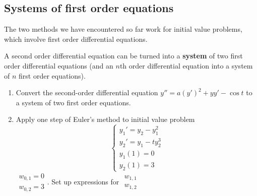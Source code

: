 \documentclass[12pt,letterpaper,noanswers]{exam}
\begin{document}
\subsection*{Systems of first order equations}
\begin{tcolorbox}
The two methods we have encountered so far work for initial value problems, which involve first order differential equations.

A second order differential equation can be turned into a \textbf{system} of two first order differential equations (and an $n$th order differential equation into  a system of $n$ first order equations).
\end{tcolorbox}
\begin{enumerate}[resume=classQ]
\item Convert the second-order differential equation $y'' = a(y')^2 +yy' - \cos t$ to a system of two first order equations.
\item Apply one step of Euler's method to initial value problem \[\left\{\begin{array}{l}
y_1' = y_2 - y_1^2 \\
y_2' = y_1 -ty_2^3 \\
y_1(1) = 0 \\
y_2(1) = 3 \end{array}\right.\]
$\begin{array}{l}
w_{0,1} = 0\\
w_{0,2} = 3
\end{array}$. Set up expressions for $\begin{array}{l}
w_{1,1}\\
w_{1,2}
\end{array}$
\vspace{1in}
\end{enumerate}
\end{document}
